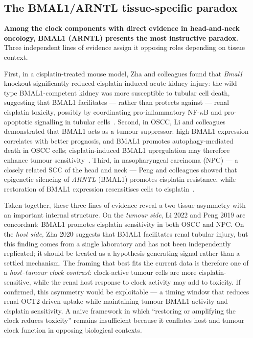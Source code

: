 \documentclass[preprint,review,12pt]{elsarticle}
\begin{document}
\subsection{The BMAL1/ARNTL tissue-specific paradox}

\textbf{Among the clock components with direct evidence in head-and-neck
oncology, BMAL1 (ARNTL) presents the most instructive paradox.}  Three
independent lines of evidence assign it opposing roles depending on tissue
context.

First, in a cisplatin-treated mouse model, Zha and colleagues found that
\emph{Bmal1} knockout significantly reduced cisplatin-induced acute kidney
injury: the wild-type BMAL1-competent kidney was more susceptible to tubular
cell death, suggesting that BMAL1 facilitates --- rather than protects
against --- renal cisplatin toxicity, possibly by coordinating
pro-inflammatory NF-$\kappa$B and pro-apoptotic signalling in tubular
cells~\cite{Zha2020}.  Second, in OSCC, Li and colleagues demonstrated that
BMAL1 acts as a tumour suppressor: high BMAL1 expression correlates with
better prognosis, and BMAL1 promotes autophagy-mediated death in OSCC cells;
cisplatin-induced BMAL1 upregulation may therefore enhance tumour
sensitivity~\cite{Li2022ARNTL}.  Third, in nasopharyngeal carcinoma (NPC)
--- a closely related SCC of the head and neck --- Peng and colleagues
showed that epigenetic silencing of \emph{ARNTL} (BMAL1) promotes cisplatin
resistance, while restoration of BMAL1 expression resensitises cells to
cisplatin~\cite{Peng2019}.

Taken together, these three lines of evidence reveal a two-tissue asymmetry
with an important internal structure.  On the \emph{tumour side}, Li 2022
and Peng 2019 are concordant: BMAL1 promotes cisplatin sensitivity in both
OSCC and NPC.  On the \emph{host side}, Zha 2020 suggests that BMAL1
facilitates renal tubular injury, but this finding comes from a single
laboratory and has not been independently replicated; it should be treated
as a hypothesis-generating signal rather than a settled mechanism.  The
framing that best fits the current data is therefore one of a
\emph{host--tumour clock contrast}: clock-active tumour cells are more
cisplatin-sensitive, while the renal host response to clock activity may
add to toxicity.  If confirmed, this asymmetry would be exploitable --- a
timing window that reduces renal OCT2-driven uptake while maintaining
tumour BMAL1 activity and cisplatin sensitivity.  A naive framework in which
``restoring or amplifying the clock reduces toxicity'' remains insufficient
because it conflates host and tumour clock function in opposing biological
contexts.
\end{document}
